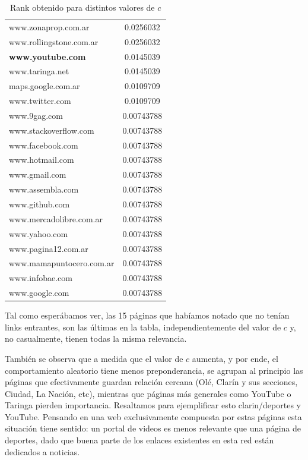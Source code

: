 \begin{table}
\begin{center}
{\begin{tabular}{ l | c }
www.zonaprop.com.ar & 0.0256032 \\
www.rollingstone.com.ar & 0.0256032 \\
\textbf{www.youtube.com} & 0.0145039 \\
www.taringa.net & 0.0145039 \\
maps.google.com.ar & 0.0109709 \\
www.twitter.com & 0.0109709 \\
www.9gag.com & 0.00743788 \\
www.stackoverflow.com & 0.00743788 \\
www.facebook.com & 0.00743788 \\
www.hotmail.com & 0.00743788 \\
www.gmail.com & 0.00743788 \\
www.assembla.com & 0.00743788 \\
www.github.com & 0.00743788 \\
www.mercadolibre.com.ar & 0.00743788 \\
www.yahoo.com & 0.00743788 \\
www.pagina12.com.ar & 0.00743788 \\
www.mamapuntocero.com.ar & 0.00743788 \\
www.infobae.com & 0.00743788 \\
www.google.com & 0.00743788 \\
\hline
\end{tabular}
}

\caption{Rank obtenido para distintos valores de $c$}
\label{tab:ranking}
\end{center}\end{table}

Tal como esper\'abamos ver, las 15 p\'aginas que hab\'iamos notado que no ten\'ian links entrantes, son las \'ultimas
en la tabla, independientemente del valor de $c$ y, no casualmente, tienen todas la misma relevancia.

También se observa que a medida que el valor de $c$ aumenta, y por ende, el comportamiento aleatorio tiene menos preponderancia, se agrupan al principio las páginas que efectivamente guardan relación cercana (Olé, Clarín y sus secciones, Ciudad, La Nación, etc), mientras que páginas más generales como YouTube o Taringa pierden importancia. Resaltamos para ejemplificar esto clarin/deportes y YouTube. Pensando en una web exclusivamente compuesta por estas páginas esta situación tiene sentido: un portal de videos es menos relevante que una página de deportes, dado que buena parte de los enlaces existentes en esta red están dedicados a noticias.

